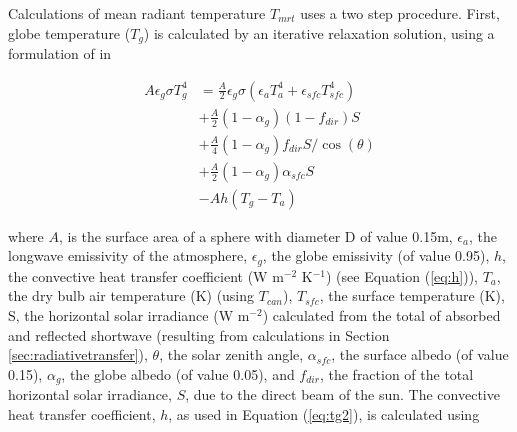 \documentclass[final,3p,times,authoryear]{elsarticle}
\begin{document}

Calculations of mean radiant temperature $T_{mrt}$ uses a two step procedure. First, globe temperature ($T_{g}$) is calculated by an iterative relaxation solution, using a formulation of \cite{Liljegren2008} in  

\begin{equation}\label{eq:tg2}
\begin{split}
A\epsilon_{g}\sigma T_{g}^{4} &= \frac{A}{2} \epsilon_{g}\sigma( \epsilon_{a} T_{a}^{4} +  \epsilon_{sfc} T_{sfc}^{4} ) \\
&+ \frac{A}{2}( 1-\alpha_{g})(1-f_{dir})S  \\
&+ \frac{A}{4}( 1-\alpha_{g})f_{dir}S /\cos(\theta) \\
&+ \frac{A}{2}( 1-\alpha_{g})\alpha_{sfc}S \\
&- Ah(T_{g}-T_{a})   
\end{split}
\end{equation}

where $A$, is the surface area of a sphere with diameter D of value 0.15m,
$\epsilon_{a}$, the longwave emissivity of the atmosphere, 
$\epsilon_{g}$, the globe emissivity (of value 0.95), 
$h$, the convective heat transfer coefficient (W m$^{-2}$ K$^{-1}$) (see Equation (\ref{eq:h})), 
$T_{a}$, the dry bulb air temperature (K) (using $T_{can}$), 
$T_{sfc}$, the surface temperature (K), 
S, the horizontal solar irradiance (W m$^{-2}$) calculated from the total of absorbed and reflected shortwave (resulting from calculations in Section \ref{sec:radiativetransfer}), 
$\theta$, the solar zenith angle, 
$\alpha_{sfc}$, the surface albedo (of value 0.15),  
$\alpha_{g}$, the globe albedo (of value 0.05), and 
$f_{dir}$, the fraction of the total horizontal solar irradiance, $S$, due to the direct
beam of the sun. The convective heat transfer coefficient, $h$, as used in Equation (\ref{eq:tg2}), is calculated using 
\end{document}

